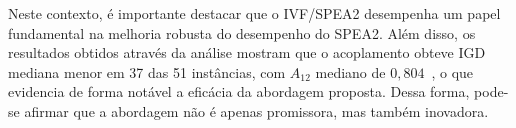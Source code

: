 Neste contexto, é importante destacar que o IVF/SPEA2 desempenha um papel fundamental na melhoria robusta do desempenho do SPEA2. Além disso, os resultados obtidos através da análise mostram que o acoplamento obteve IGD mediana menor em 37 das 51 instâncias, com $A_{12}$ mediano de $0{,}804$~\cite{vargha2000critique}, o que evidencia de forma notável a eficácia da abordagem proposta. Dessa forma, pode-se afirmar que a abordagem não é apenas promissora, mas também inovadora.
